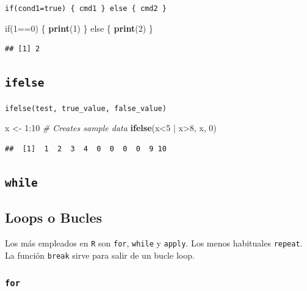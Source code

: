 \documentclass[]{article}
\newenvironment{Shaded}{\begin{snugshade}}{\end{snugshade}}
\newcommand{\KeywordTok}[1]{\textcolor[rgb]{0.13,0.29,0.53}{\textbf{{#1}}}}
\newcommand{\DecValTok}[1]{\textcolor[rgb]{0.00,0.00,0.81}{{#1}}}
\newcommand{\StringTok}[1]{\textcolor[rgb]{0.31,0.60,0.02}{{#1}}}
\newcommand{\CommentTok}[1]{\textcolor[rgb]{0.56,0.35,0.01}{\textit{{#1}}}}
\newcommand{\NormalTok}[1]{{#1}}
\numberwithin{equation}{section}
\begin{document}
\texttt{if(cond1=true)\ \{\ cmd1\ \}\ else\ \{\ cmd2\ \}}

\begin{Shaded}
\begin{Highlighting}[]
\NormalTok{if(}\DecValTok{1}\NormalTok{==}\DecValTok{0}\NormalTok{) \{}
    \KeywordTok{print}\NormalTok{(}\DecValTok{1}\NormalTok{)}
\NormalTok{\} else \{}
    \KeywordTok{print}\NormalTok{(}\DecValTok{2}\NormalTok{)}
\NormalTok{\}}
\end{Highlighting}
\end{Shaded}

\begin{verbatim}
## [1] 2
\end{verbatim}

\subsection{\texorpdfstring{\texttt{ifelse}}{ifelse}}\label{ifelse}

\texttt{ifelse(test,\ true\_value,\ false\_value)}

\begin{Shaded}
\begin{Highlighting}[]
\NormalTok{x <-}\StringTok{ }\DecValTok{1}\NormalTok{:}\DecValTok{10} \CommentTok{# Creates sample data}
\KeywordTok{ifelse}\NormalTok{(x<}\DecValTok{5} \NormalTok{|}\StringTok{ }\NormalTok{x>}\DecValTok{8}\NormalTok{, x, }\DecValTok{0}\NormalTok{)}
\end{Highlighting}
\end{Shaded}

\begin{verbatim}
##  [1]  1  2  3  4  0  0  0  0  9 10
\end{verbatim}

\subsection{\texorpdfstring{\texttt{while}}{while}}\label{while}

\subsection{Loops o Bucles}\label{loops-o-bucles}

Los más empleados en \texttt{R} son \texttt{for}, \texttt{while} y
\texttt{apply}. Los menos habituales \texttt{repeat}. La función
\texttt{break} sirve para salir de un bucle loop.

\subsubsection{\texorpdfstring{\texttt{for}}{for}}\label{for}
\end{document}
